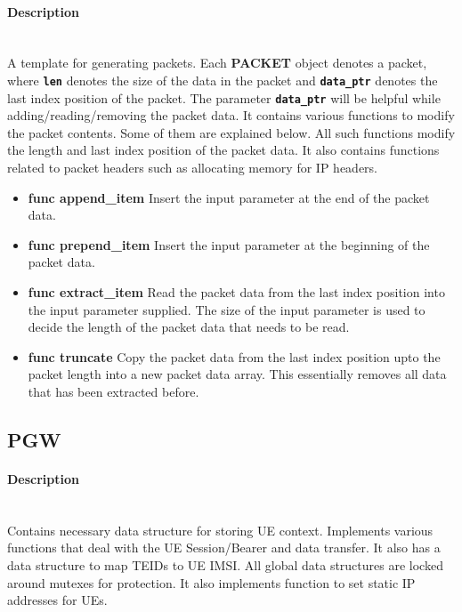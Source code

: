 \documentclass[hidelinks]{report}
\newcommand{\cf}[1] {
	\textbf{\texttt{#1}}
}
\begin{document}
\paragraph*{Description}

~\\ A template for generating packets. Each \textbf{PACKET} object denotes a packet, where \cf{len} denotes the size of the data in the packet and \cf{data\_ptr} denotes the last index position of the packet. The parameter \cf{data\_ptr} will be helpful while adding/reading/removing the packet data. It contains various functions to modify the packet contents. Some of them are explained below. All such functions modify the length and last index position of the packet data. It also contains functions related to packet headers such as allocating memory for IP headers.

\begin{itemize}

\item \textbf{func append\_item} Insert the input parameter at the end of the packet data. 

\item \textbf{func prepend\_item} Insert the input parameter at the beginning of the packet data.

\item \textbf{func extract\_item} Read the packet data from the last index position into the input parameter supplied. The size of the input parameter is used to decide the length of the packet data that needs to be read.

\item \textbf{func truncate} Copy the packet data from the last index position upto the packet length into a new packet data array. This essentially removes all data that has been extracted before.

\end{itemize}

\subsection*{PGW}

\paragraph*{Description}

~\\ Contains necessary data structure for storing UE context. Implements various functions that deal with the UE Session/Bearer and data transfer. It also has a data structure to map TEIDs to UE IMSI. All global data structures are locked around mutexes for protection. It also implements function to set static IP addresses for UEs.
\end{document}
